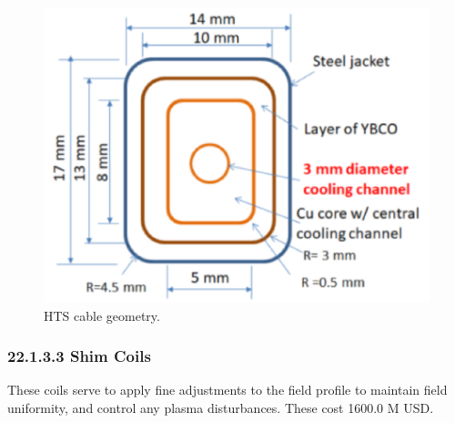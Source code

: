 \begin{figure}[h]
    \centering
    \includegraphics[width =0.5\linewidth]{StandardFigures/yuhu_cs.pdf}
    \caption{HTS cable geometry.}
    \label{fig:yuhu_cs}
\end{figure}

\subsubsection*{22.1.3.3 Shim Coils}

These coils serve to apply fine adjustments to the field profile to maintain field uniformity, and control any plasma disturbances. These cost 1600.0 M USD.\\

